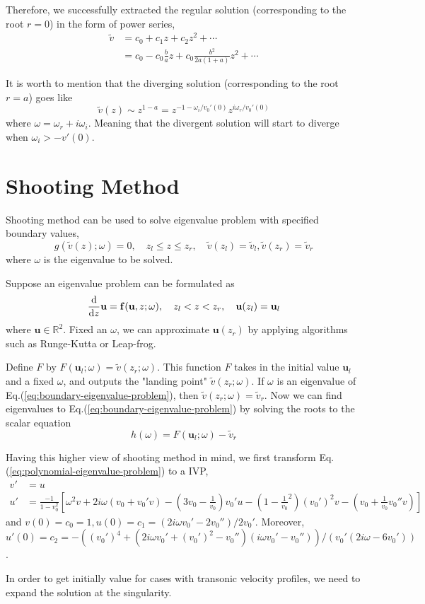 Therefore, we successfully extracted the regular solution (corresponding to the root $r=0$) in the form of power series,
\begin{equation} \label{eq:regular-solution}
	\begin{aligned}
		\tilde{v} & = c_0 + c_1z + c_2z^2 + \cdots                               \\
		          & = c_0 - c_0\frac{b}{a}z + c_0\frac{b^2}{2a(1+a)}z^2 + \cdots
	\end{aligned}
\end{equation}

It is worth to mention that the diverging solution (corresponding to the root $r=a$) goes like
\[ \tilde{v}(z) \sim z^{1-a} = z^{-1-\omega_i/v_0'(0)}z^{i\omega_r/v_0'(0)}  \]
where $\omega = \omega_r + i\omega_i$. Meaning that the divergent solution will start to diverge when $\omega_i > -v'(0)$.

\section{Shooting Method}
Shooting method can be used to solve eigenvalue problem with specified boundary values,
\begin{equation} \label{eq:boundary-eigenvalue-problem}
	g(\tilde{v}(z);\omega) = 0,
	\quad
	z_l \leq z \leq z_r,
	\quad
	\tilde{v}(z_l) = \tilde{v}_l, \tilde{v}(z_r) = \tilde{v}_r
\end{equation}
where $\omega$ is the eigenvalue to be solved.

Suppose an eigenvalue problem can be formulated as
\[ \dv{z}\mathbf{u} = \mathbf{f}(\mathbf{u},z;\omega),
	\quad
	z_l<z<z_r,
	\quad
	\mathbf{u}(z_l) = \mathbf{u}_l
\]
where $\mathbf{u}\in\mathbb{R}^2$. Fixed an $\omega$, we can approximate $\mathbf{u}(z_r)$ by applying algorithms such as Runge-Kutta or Leap-frog.

Define $F$ by $F(\mathbf{u}_l;\omega)=\tilde{v}(z_r;\omega)$. This function $F$ takes in the initial value $\mathbf{u}_l$ and a fixed $\omega$, and outputs the "landing point" $\tilde{v}(z_r;\omega)$. If $\omega$ is an eigenvalue of Eq.(\ref{eq:boundary-eigenvalue-problem}), then $\tilde{v}(z_r;\omega) = \tilde{v}_r$. Now we can find eigenvalues to Eq.(\ref{eq:boundary-eigenvalue-problem}) by solving the roots to the scalar equation
\[h(\omega) = F(\mathbf{u}_l;\omega) - \tilde{v}_r\]

Having this higher view of shooting method in mind, we first transform Eq.(\ref{eq:polynomial-eigenvalue-problem}) to a IVP,
\begin{align*}
	v' & = u                        \\
	u' & = \frac{-1}{1-v_0^2}\left[
		\omega^2v + 2i\omega(v_0+v_0'v) - \left(3v_0 - \frac{1}{v_0}\right)v_0'u - \left(1-\frac{1}{v_0}^2\right)(v_0')^2v - \left(v_0+\frac{1}{v_0}v_0'' v\right)
		\right]
\end{align*}
and $v(0)=c_0=1,u(0)=c_1=(2i\omega v_0'-2v_0'')/2v_0'$. Moreover, $u'(0)=c_2=-((v_0')^4+(2i\omega v_0' + (v_0')^2 - v_0'')(i\omega v_0' - v_0''))/(v_0'(2i\omega-6v_0'))$.

In order to get initially value for cases with transonic velocity profiles, we need to expand the solution at the singularity.

